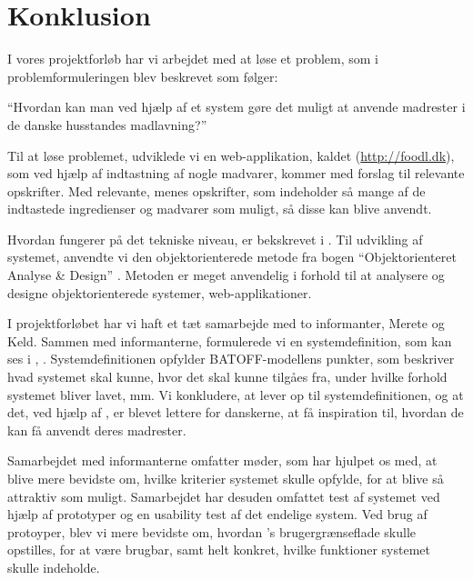 \chapter{Konklusion}
\label{chap:konklusion}

I vores projektforløb har vi arbejdet med at løse et problem, som i problemformuleringen blev beskrevet som følger:

``Hvordan kan man ved hjælp af et system gøre det muligt at anvende madrester i de danske husstandes madlavning?''

Til at løse problemet, udviklede vi en web-applikation, kaldet \Foodl{} (\url{http://foodl.dk}), som ved hjælp af indtastning af nogle madvarer, kommer med forslag til relevante opskrifter. Med relevante, menes opskrifter, som indeholder så mange af de indtastede ingredienser og madvarer som muligt, så disse kan blive anvendt.

Hvordan \Foodl{} fungerer på det tekniske niveau, er bekskrevet i . Til udvikling af systemet, anvendte vi den objektorienterede metode fra bogen ``Objektorienteret Analyse \& Design'' \cite{ooad}. Metoden er meget anvendelig i forhold til at analysere og designe objektorienterede systemer, \fx web-applikationer. 

I projektforløbet har vi haft et tæt samarbejde med to informanter, Merete og Keld. Sammen med informanterne, formulerede vi en systemdefinition, som kan ses i , . Systemdefinitionen opfylder BATOFF-modellens punkter, som beskriver hvad systemet skal kunne, hvor det skal kunne tilgåes fra, under hvilke forhold systemet bliver lavet, mm. Vi konkludere, at \Foodl{} lever op til systemdefinitionen, og at det, ved hjælp af \Foodl{}, er blevet lettere for danskerne, at få inspiration til, hvordan de kan få anvendt deres madrester.

Samarbejdet med informanterne omfatter møder, som har hjulpet os med, at blive mere bevidste om, hvilke kriterier systemet skulle opfylde, for at blive så attraktiv som muligt. Samarbejdet har desuden omfattet test af systemet ved hjælp af prototyper og en usability test af det endelige system. Ved brug af protoyper, blev vi mere bevidste om, hvordan \Foodl{}'s brugergrænseflade skulle opstilles, for at være brugbar, samt helt konkret, hvilke funktioner systemet skulle indeholde.

